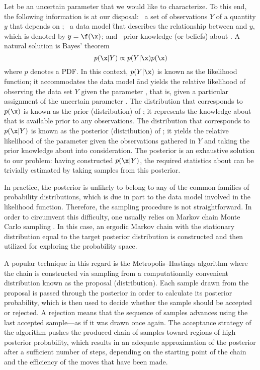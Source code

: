 Let \x be an uncertain parameter that we would like to characterize. To this
end, the following information is at our disposal: \one~a set of observations
$Y$ of a quantity $y$ that depends on \x; \two~a data model \f that describes
the relationship between \x and $y$, which is denoted by $y = \f(\x)$; and
\three~prior knowledge (or beliefs) about \x. A natural solution is Bayes'
theorem \cite{gelman2013}
\[
  p(\x | Y) \propto p(Y | \x) p(\x)
\]
where $p$ denotes a \ac{PDF}. In this context, $p(Y | \x)$ is known as the
likelihood function; it accommodates the data model \f and yields the relative
likelihood of observing the data set $Y$ given the parameter \x, that is, given
a particular assignment of the uncertain parameter \x. The distribution that
corresponds to $p(\x)$ is known as the prior (distribution) of \x; it represents
the knowledge about \x that is available prior to any observations. The
distribution that corresponds to $p(\x | Y)$ is known as the posterior
(distribution) of \x; it yields the relative likelihood of the parameter \x
given the observations gathered in $Y$ and taking the prior knowledge about \x
into consideration. The posterior is an exhaustive solution to our problem:
having constructed $p(\x | Y)$, the required statistics about \x can be
trivially estimated by taking samples from this posterior.

In practice, the posterior is unlikely to belong to any of the common families
of probability distributions, which is due in part to the data model involved in
the likelihood function. Therefore, the sampling procedure is not
straightforward. In order to circumvent this difficulty, one usually relies on
Markov chain Monte Carlo sampling \cite{gelman2013}. In this case, an ergodic
Markov chain with the stationary distribution equal to the target posterior
distribution is constructed and then utilized for exploring the probability
space.

A popular technique in this regard is the Metropolis--Hastings algorithm
\cite{gelman2013} where the chain is constructed via sampling from a
computationally convenient distribution known as the proposal (distribution).
Each sample drawn from the proposal is passed through the posterior in order to
calculate its posterior probability, which is then used to decide whether the
sample should be accepted or rejected. A rejection means that the sequence of
samples advances using the last accepted sample---as if it was drawn once again.
The acceptance strategy of the algorithm pushes the produced chain of samples
toward regions of high posterior probability, which results in an adequate
approximation of the posterior after a sufficient number of steps, depending on
the starting point of the chain and the efficiency of the moves that have been
made.
